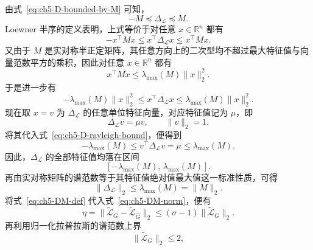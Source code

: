 由式~\eqref{eq:ch5-D-bounded-by-M} 可知，
\begin{equation}
  -M \preceq \Delta_{\mathcal{L}} \preceq M.
\end{equation}
Loewner 半序的定义表明，上式等价于对任意 $x\in\mathbb{R}^n$ 都有
\begin{equation}
  -x^\top M x
  \le
  x^\top \Delta_{\mathcal{L}} x
  \le
  x^\top M x.
  \label{eq:ch5-D-quadratic-bound}
\end{equation}
又由于 $M$ 是实对称半正定矩阵，其任意方向上的二次型均不超过最大特征值与向量范数平方的乘积\cite{HornJohnson2012,Parlett1998}，因此对任意 $x\in\mathbb{R}^n$ 都有
\begin{equation}
  x^\top M x
  \le
  \lambda_{\max}(M)\|x\|_2^2.
  \label{eq:ch5-M-rayleigh-bound}
\end{equation}
于是进一步有
\begin{equation}
  -\lambda_{\max}(M)\|x\|_2^2
  \le
  x^\top \Delta_{\mathcal{L}} x
  \le
  \lambda_{\max}(M)\|x\|_2^2.
  \label{eq:ch5-D-rayleigh-bound}
\end{equation}
现在取 $x=v$ 为 $\Delta_{\mathcal{L}}$ 的任意单位特征向量，对应特征值记为 $\mu$，即
\begin{equation}
  \Delta_{\mathcal{L}}v=\mu v,
  \qquad
  \|v\|_2=1.
  \label{eq:ch5-D-eigpair}
\end{equation}
将其代入式~\eqref{eq:ch5-D-rayleigh-bound}，便得到
\begin{equation}
  -\lambda_{\max}(M)
  \le
  v^\top \Delta_{\mathcal{L}} v
  =
  \mu
  \le
  \lambda_{\max}(M).
  \label{eq:ch5-D-eig-bound}
\end{equation}
因此，$\Delta_{\mathcal{L}}$ 的全部特征值均落在区间
\begin{equation}
  \left[-\lambda_{\max}(M),\,\lambda_{\max}(M)\right].
  \label{eq:ch5-D-eig-interval}
\end{equation}
再由实对称矩阵的谱范数等于其特征值绝对值最大值这一标准性质\cite{HornJohnson2012}，可得
\begin{equation}
  \|\Delta_{\mathcal{L}}\|_2
  \le
  \lambda_{\max}(M)
  =
  \|M\|_2.
  \label{eq:ch5-DM-norm}
\end{equation}
将式~\eqref{eq:ch5-DM-def} 代入式~\eqref{eq:ch5-DM-norm}，便有
\begin{equation}
  \eta
  =
  \|\tilde{\mathcal{L}}_{G}-\tilde{\mathcal{L}}_{\hat G}\|_2
  \le
  (\sigma-1)\|\tilde{\mathcal{L}}_G\|_2.
  \label{eq:ch5-eta-from-sigma-step}
\end{equation}
再利用归一化拉普拉斯的谱范数上界
\begin{equation}
  \|\tilde{\mathcal{L}}_G\|_2\le 2,
  \label{eq:ch5-L-norm2}
\end{equation}
